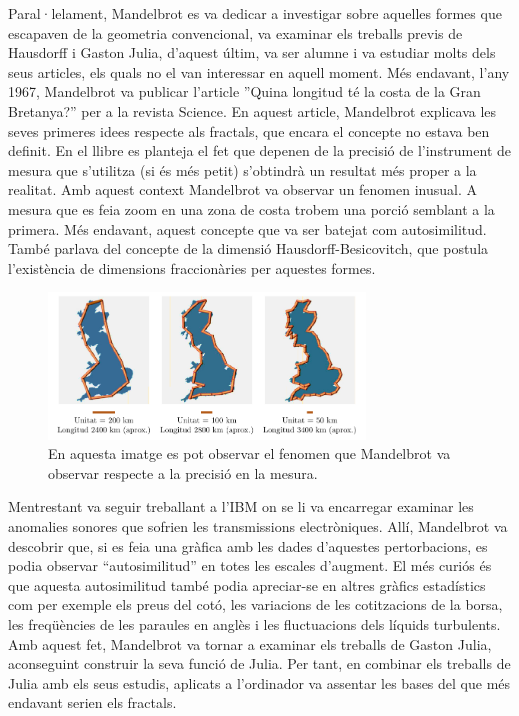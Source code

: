 \documentclass[12pt,a4paper]{report}
\begin{document}
Paral·lelament, Mandelbrot es va dedicar a investigar sobre aquelles formes que escapaven de la geometria convencional, va examinar els treballs previs de Hausdorff i Gaston Julia, d’aquest últim, va ser alumne i va estudiar molts dels seus articles, els quals no el van interessar en aquell moment. Més endavant, l'any 1967, Mandelbrot va publicar l’article ''Quina longitud té la costa de la Gran Bretanya?'' per a la revista Science. En aquest article, Mandelbrot explicava les seves primeres idees respecte als fractals, que encara el concepte no estava ben definit. En el llibre es planteja el fet que depenen de la precisió de l’instrument de mesura que s'utilitza (si és més petit) s’obtindrà un resultat més proper a la realitat. Amb aquest context Mandelbrot va observar un fenomen inusual. A mesura que es feia zoom en una zona de costa trobem una porció semblant a la primera. Més endavant, aquest concepte que va ser batejat com autosimilitud. També parlava del concepte de la dimensió Hausdorff-Besicovitch, que postula l'existència de dimensions fraccionàries per aquestes formes. 
\begin{figure}[!ht]
\centering
\includegraphics[width=0.75\textwidth]{img/img01_04_britain.pdf}
\caption{En aquesta imatge es pot observar el fenomen que Mandelbrot va observar respecte a la precisió en la mesura.}
\label{img01_04}
\end{figure}
Mentrestant va seguir treballant a l'IBM on se li va encarregar examinar les anomalies sonores que sofrien les transmissions electròniques. Allí, Mandelbrot va descobrir que, si es feia una gràfica amb les dades d'aquestes pertorbacions, es podia observar “autosimilitud” en totes les escales d'augment. El més curiós és que aquesta autosimilitud també podia apreciar-se en altres gràfics estadístics com per exemple els preus del cotó, les variacions de les cotitzacions de la borsa, les freqüències de les paraules en anglès i les fluctuacions dels líquids turbulents. Amb aquest fet, Mandelbrot va tornar a examinar els treballs de Gaston Julia, aconseguint construir la seva funció de Julia. Per tant, en combinar els treballs de Julia amb els seus estudis, aplicats a l’ordinador va assentar les bases del que més endavant serien els fractals.
\end{document}
